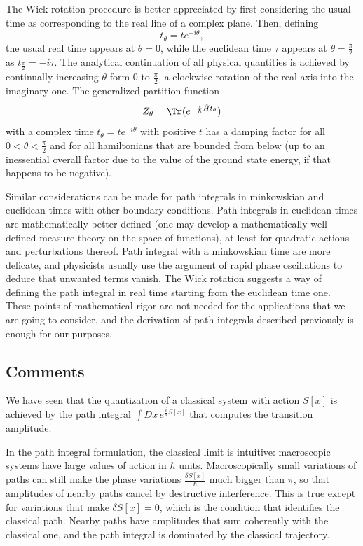 The Wick rotation procedure is better appreciated by first considering the usual time as corresponding to the real line of a complex plane. Then, defining
\[
    t_{\theta} = t e^{-i\theta},
\]
the usual real time appears at \(\theta=0\), while the euclidean time \(\tau\) appears at \(\theta = \frac{\pi}{2}\)  as \(t_{\frac{\pi}{2}} = -i \tau\). The analytical continuation of all physical quantities is achieved by continually increasing \(\theta\) form 0 to \(\frac{\pi}{2}\), a clockwise rotation of the real axis into the imaginary one. The generalized partition function
\[
    Z_{\theta} = \Tr(e^{-\frac{i}{\hbar} \hat{H} t_{\theta}})
\]
with a complex time \(t_{\theta} = t e^{-i\theta}\) with positive \(t\) has a damping factor for all \(0 < \theta < \frac{\pi}{2}\) and for all hamiltonians that are bounded from below (up to an inessential overall factor due to the value of the ground state energy, if that happens to be negative).

Similar considerations can be made for path integrals in minkowskian and euclidean times with other boundary conditions. Path integrals in euclidean times are mathematically better defined (one may develop a mathematically well-defined measure theory on the space of functions), at least for quadratic actions and perturbations thereof. Path integral with a minkowskian time are more delicate, and physicists usually use the argument of rapid phase oscillations to deduce that unwanted terms vanish. The Wick rotation suggests a way of defining the path integral in real time starting from the euclidean time one. These points of mathematical rigor are not needed for the applications that we are going to consider, and the derivation of path integrals described previously is enough for our purposes.

\subsection{Comments}

We have seen that the quantization of a classical system with action $S[x]$ is achieved by the path integral $\int Dx \, e^{\frac{i}{\hbar}S[x]}$ that computes the transition amplitude.

In the path integral formulation, the classical limit is intuitive: macroscopic systems have large values of action in $\hbar$ units. Macroscopically small variations of paths can still make the phase variations $\frac{\delta S[x]}{\hbar}$ much bigger than $\pi$, so that amplitudes of nearby paths cancel by destructive interference. This is true except for variations that make $\delta S[x] = 0$, which is the condition that identifies the classical path. Nearby paths have amplitudes that sum coherently with the classical one, and the path integral is dominated by the classical trajectory.

